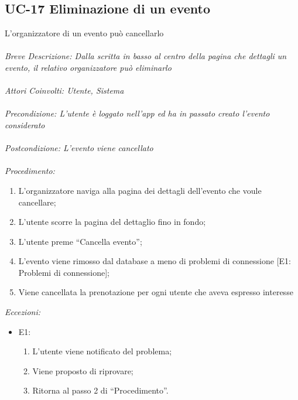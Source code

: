 \subsection{UC-17 Eliminazione di un evento}
L'organizzatore di un evento può cancellarlo
\\
\\
\textit{Breve Descrizione: Dalla scritta in basso al centro della pagina che dettagli un evento, il relativo organizzatore può eliminarlo} 
\\
\\
\textit{Attori Coinvolti: Utente, Sistema}
\\
\\
\textit{Precondizione: L'utente è loggato nell'app ed ha in passato creato l'evento considerato}
\\
\\
\textit{Postcondizione: L'evento viene cancellato}
\\
\\
\textit{Procedimento:}
\begin{enumerate}
	\item L'organizzatore naviga alla pagina dei dettagli dell'evento che voule cancellare;
	\item L'utente scorre la pagina del dettaglio fino in fondo;
	\item L'utente preme ``Cancella evento'';
	\item L'evento viene rimosso dal database a meno di problemi di connessione [E1: Problemi di connessione];
	\item Viene cancellata la prenotazione per ogni utente che aveva espresso interesse
\end{enumerate}


\textit{Eccezioni:}
\begin{itemize}
	\item E1:
	\begin{enumerate}
		\item L'utente viene notificato del problema;
		\item Viene proposto di riprovare;
		\item Ritorna al passo 2 di ``Procedimento''.
	\end{enumerate}
\end{itemize}
